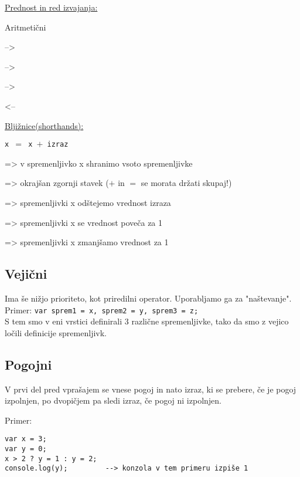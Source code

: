 \underline{Prednost in red izvajanja:}\

\begin{labeling}{Aritmetični}
	\item [Aritmetični] --> 
	\item [Primerjalni] -->
	\item [Logični] -->
	\item [Priredilni] <--
\end{labeling}

\underline{Bljižnice(shorthands):}\

\begin{labeling}{\texttt{x $=$ x $+$ izraz}}
	\item [\texttt{x $=$ x $+$ izraz}] => v spremenljivko x shranimo vsoto spremenljivke
	\item [\texttt{x $+=$ izraz}] => okrajšan zgornji stavek ($+$ in $=$ se morata držati skupaj!)
	\item[\texttt{x $-=$ izraz}] => spremenljivki x odštejemo vrednost izraza
	\item [\texttt{x$++$}] => spremenljivki x se vrednost poveča za 1
	\item[\texttt{x$--$}] => spremenljivki x zmanjšamo vrednost za 1
\end{labeling}

\subsection{Vejični}

Ima še nižjo prioriteto, kot priredilni operator.
Uporabljamo ga za "naštevanje". Primer:
\texttt{var sprem1 = x, sprem2 = y, sprem3 = z;}\\
S tem smo v eni vrstici definirali 3 različne spremenljivke, tako da smo z vejico ločili definicije spremenljivk.

\subsection{Pogojni}

{\centering{}\par}

V prvi del pred vprašajem se vnese pogoj in nato izraz, ki se prebere, če je pogoj izpolnjen, po dvopičjem pa sledi izraz, če pogoj ni izpolnjen.

Primer:
\begin{verbatim}
var x = 3;
var y = 0;
x > 2 ? y = 1 : y = 2;
console.log(y);			--> konzola v tem primeru izpiše 1
\end{verbatim}

